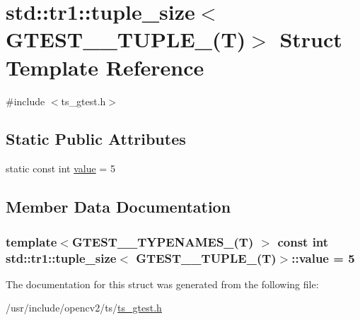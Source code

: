 \hypertarget{structstd_1_1tr1_1_1tuple__size_3_01GTEST__5__TUPLE___07T_08_4}{\section{std\-:\-:tr1\-:\-:tuple\-\_\-size$<$ G\-T\-E\-S\-T\-\_\-\_\-\-T\-U\-P\-L\-E\-\_\-(T)$>$ Struct Template Reference}
\label{structstd_1_1tr1_1_1tuple__size_3_01GTEST__5__TUPLE___07T_08_4}
}


{\ttfamily \#include $<$ts\-\_\-gtest.\-h$>$}

\subsection*{Static Public Attributes}
\begin{DoxyCompactItemize}
\item 
static const int \hyperlink{structstd_1_1tr1_1_1tuple__size_3_01GTEST__5__TUPLE___07T_08_4_aa15d6218ab2b8ba1eb8ddac629db5b29}{value} = 5
\end{DoxyCompactItemize}


\subsection{Member Data Documentation}
\hypertarget{structstd_1_1tr1_1_1tuple__size_3_01GTEST__5__TUPLE___07T_08_4_aa15d6218ab2b8ba1eb8ddac629db5b29}{
\subsubsection[{value}]{\setlength{\rightskip}{0pt plus 5cm}template$<$G\-T\-E\-S\-T\-\_\-\_\-\-T\-Y\-P\-E\-N\-A\-M\-E\-S\-\_\-(\-T) $>$ const int {\bf std\-::tr1\-::tuple\-\_\-size}$<$ {\bf G\-T\-E\-S\-T\-\_\-\_\-\-T\-U\-P\-L\-E\-\_\-}({\bf T})$>$\-::value = 5\hspace{0.3cm}{\ttfamily [static]}}}\label{structstd_1_1tr1_1_1tuple__size_3_01GTEST__5__TUPLE___07T_08_4_aa15d6218ab2b8ba1eb8ddac629db5b29}


The documentation for this struct was generated from the following file\-:\begin{DoxyCompactItemize}
\item 
/usr/include/opencv2/ts/\hyperlink{ts__gtest_8h}{ts\-\_\-gtest.\-h}\end{DoxyCompactItemize}
